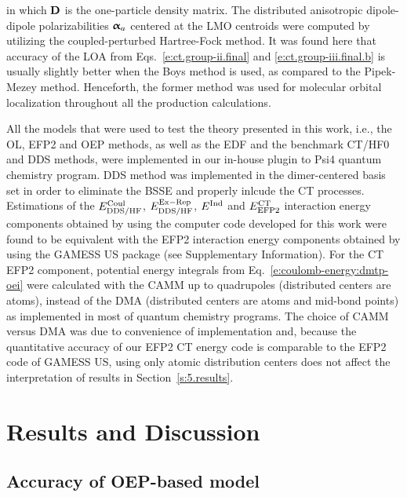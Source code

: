 \documentclass[aip,jcp,amsmath,amssymb,reprint,floatfix]{revtex4-1}
\begin{document}
%
in which ${\bf D}$ is the one\hyp{}particle density matrix.
The distributed anisotropic dipole\hyp{}dipole
polarizabilities ${\bm{\upalpha}}_a$ centered at the LMO centroids
were computed by utilizing the coupled\hyp{}perturbed Hartree\hyp{}Fock
method.\cite{McWeeny.RevModPhys.1960,Dodds.McWeeney.Sadlej.MolPhys.1977} 
It was found here that accuracy of the LOA 
from Eqs.~\eqref{e:ct.group-ii.final} and \eqref{e:ct.group-iii.final.b}
is usually slightly better 
when the Boys method\cite{Boys.RevModPhys.1960} is used, as compared
to the Pipek\hyp{}Mezey method\cite{Pipek.Mezey.JCP.1989}. Henceforth, the former
method was used for molecular orbital localization throughout all the production calculations.

All the models that were used to test the theory presented in this work,
i.e., the OL, EFP2 and OEP methods, as well as the EDF and the benchmark CT/HF0 and DDS methods,
were implemented in our in\hyp{}house plugin to {\sc Psi4} quantum chemistry program.\cite{Psi4.JCTC.2017}
DDS method was implemented in the dimer\hyp{}centered basis set\cite{Chalasinski.Gutowski.MolPhys.1985}
in order to eliminate the BSSE and properly inlcude the CT processes.\cite{Stone.Misquitta.CPL.2009}
Estimations of the $E^{\rm Coul}_{\rm DDS/HF}$, $E^{\rm Ex-Rep}_{\rm DDS/HF}$,
$E^{\rm Ind}$ and $E^{\rm CT}_{\rm EFP2}$ interaction energy components 
obtained by using the computer 
code developed for this work were
found to be equivalent with the EFP2 interaction energy components
obtained by using the {\sc GAMESS US} package\cite{GAMESS.JCC.1993} 
(see Supplementary Information).
For the CT EFP2 component,
potential energy integrals
from Eq.~\eqref{e:coulomb-energy:dmtp-oei} 
were calculated with the
CAMM up to quadrupoles
(distributed centers are atoms), 
instead of the DMA 
(distributed centers are atoms and mid\hyp{}bond points) 
as implemented in most
of quantum chemistry programs. The choice of CAMM versus DMA
was due to convenience of implementation and, because
the quantitative accuracy of our EFP2 CT energy code is comparable to
the EFP2 code of {\sc GAMESS US}, using only atomic distribution centers
does not affect the interpretation
of results in Section~\ref{s:5.results}.


\section{\label{s:5.results}Results and Discussion}

\subsection{\label{ss:5.1.accuracy}Accuracy of OEP-based model}
\end{document}
